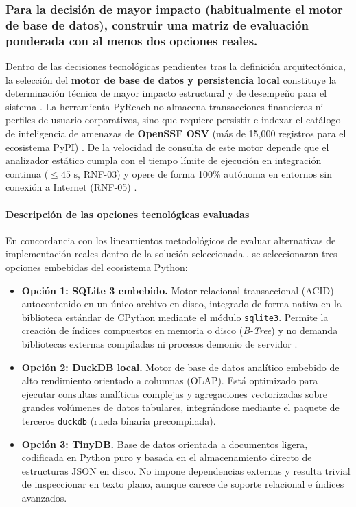 \newpage

\subsubsection{Para la decisión de mayor impacto (habitualmente el motor de base de datos), construir una matriz de evaluación ponderada con al menos dos opciones reales.}
Dentro de las decisiones tecnológicas pendientes tras la definición arquitectónica, la selección del \textbf{motor de base de datos y persistencia local} constituye la determinación técnica de mayor impacto estructural y de desempeño para el sistema \cite{pressman2020software, torres2026proyecto}. La herramienta PyReach no almacena transacciones financieras ni perfiles de usuario corporativos, sino que requiere persistir e indexar el catálogo de inteligencia de amenazas de \textbf{OpenSSF OSV} (más de 15,000 registros para el ecosistema PyPI) \cite{openssf2023osv}. De la velocidad de consulta de este motor depende que el analizador estático cumpla con el tiempo límite de ejecución en integración continua ($\le 45\text{ s}$, RNF-03) y opere de forma 100\% autónoma en entornos sin conexión a Internet (RNF-05) \cite{humble2010continuous, torres2026proyecto}.

\paragraph*{Descripción de las opciones tecnológicas evaluadas}
En concordancia con los lineamientos metodológicos de evaluar alternativas de implementación reales dentro de la solución seleccionada \cite{torres2026proyecto}, se seleccionaron tres opciones embebidas del ecosistema Python:

\begin{itemize}
    \item \textbf{Opción 1: SQLite 3 embebido.} Motor relacional transaccional (ACID) autocontenido en un único archivo en disco, integrado de forma nativa en la biblioteca estándar de CPython mediante el módulo \texttt{sqlite3}. Permite la creación de índices compuestos en memoria o disco (\textit{B-Tree}) y no demanda bibliotecas externas compiladas ni procesos demonio de servidor \cite{pressman2020software}.
    \item \textbf{Opción 2: DuckDB local.} Motor de base de datos analítico embebido de alto rendimiento orientado a columnas (OLAP). Está optimizado para ejecutar consultas analíticas complejas y agregaciones vectorizadas sobre grandes volúmenes de datos tabulares, integrándose mediante el paquete de terceros \texttt{duckdb} (rueda binaria precompilada).
    \item \textbf{Opción 3: TinyDB.} Base de datos orientada a documentos ligera, codificada en Python puro y basada en el almacenamiento directo de estructuras JSON en disco. No impone dependencias externas y resulta trivial de inspeccionar en texto plano, aunque carece de soporte relacional e índices avanzados.
\end{itemize}

